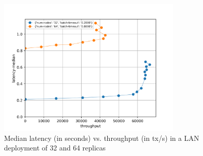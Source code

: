 \documentclass{article}
\begin{document}
\begin{figure}
    \centering
    \includegraphics[width=0.79\textwidth]{figures/results-lan-final.png}
    \caption{\centering Median latency (in seconds) vs. throughput (in tx/s)
    in a LAN deployment of 32 and 64 replicas}
    \label{fig:eval-lan}
\end{figure}


\end{document}
